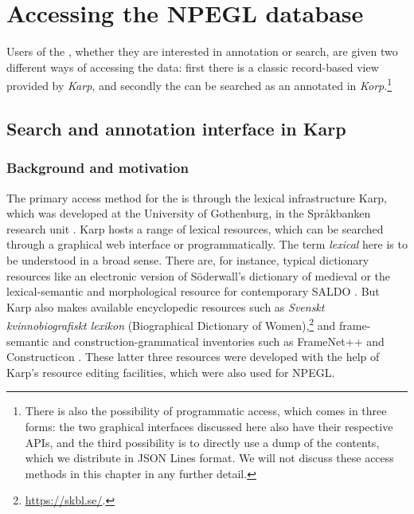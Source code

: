 \documentclass[output=paper,colorlinks,citecolor=brown]{langscibook}
\begin{document}
\section{Accessing the NPEGL database}
\label{sec:interfaces}
\label{sec:searching}

Users of the , whether they are interested in annotation or search, are given two different ways of accessing the data: first there is a classic record-based view provided by \textit{Karp}, and secondly the  can be searched as an annotated  in \textit{Korp}.\footnote{There is also the possibility of programmatic access, which comes in three forms: the two graphical interfaces discussed here also have their respective APIs, and the third possibility is to directly use a dump of the  contents, which we distribute in JSON Lines format. We will not discuss these access methods in this chapter in any further detail.}

\subsection{Search and annotation interface in Karp}

\subsubsection{Background and motivation}
\begin{sloppypar}
The primary access method for the  is through the
lexical infrastructure Karp, which was developed at the University of Gothenburg, in the Språkbanken research unit \citep{karp}. Karp hosts a range of
lexical resources, which can be searched through a graphical web interface or
programmatically. The term \textit{lexical} here is to be understood in a broad sense. There are, for instance, typical dictionary resources like an electronic version of Söderwall's dictionary of
medieval  \citep{soderwall} or the lexical-semantic and morphological resource for contemporary  SALDO \citep{borin-etal:2013}. But Karp also makes available encyclopedic resources such as \textit{Svenskt kvinnobiografiskt lexikon} (Biographical Dictionary of 
Women),\footnote{\url{https://skbl.se/}.} and frame-semantic and
construction-grammatical inventories such as  FrameNet++
\citep{dannells-etal:2021} and  Constructicon
\citep{lyngfelt-etal:2018}. These latter three resources were developed with the help of Karp's resource editing facilities, which were also used for NPEGL.
\end{sloppypar}
\end{document}
